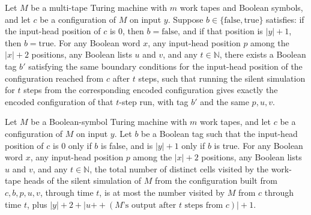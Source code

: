 \begin{theorem}
\label{Turing.vhostSilentTM_runFrom}
\leanok
{}
Let $M$ be a multi-tape Turing machine with $m$ work tapes and Boolean symbols, and let
$c$ be a configuration of $M$ on input $y$. Suppose
$b\in\{\mathrm{false},\mathrm{true}\}$ satisfies: if the input-head position of $c$ is
$0$, then $b=\mathrm{false}$, and if that position is $|y|+1$, then $b=\mathrm{true}$.
For any Boolean word $x$, any input-head position $p$ among the $|x|+2$ positions, any
Boolean lists $u$ and $v$, and any $t\in\mathbb{N}$, there exists a Boolean tag $b'$
satisfying the same boundary conditions for the input-head position of the configuration
reached from $c$ after $t$ steps, such that running the silent simulation for $t$ steps
from the corresponding encoded configuration gives exactly the encoded configuration of
that $t$-step run, with tag $b'$ and the same $p,u,v$.
\end{theorem}

\begin{theorem}
\label{Turing.vhostSilentTM_spaceUsed_le}
\leanok
{}
Let $M$ be a Boolean-symbol Turing machine with $m$ work tapes, and let $c$ be a
configuration of $M$ on input $y$. Let $b$ be a Boolean tag such that the input-head
position of $c$ is $0$ only if $b$ is false, and is $|y|+1$ only if $b$ is true. For any
Boolean word $x$, any input-head position $p$ among the $|x|+2$ positions, any Boolean
lists $u$ and $v$, and any $t\in\mathbb{N}$, the total number of distinct cells visited
by the work-tape heads of the silent simulation of $M$ from the configuration built from
$c,b,p,u,v$, through time $t$, is at most the number visited by $M$ from $c$ through
time $t$, plus $|y|+2+|u\mathbin{++}(M\text{'s output after }t\text{ steps from }c)|+1$.
\end{theorem}
